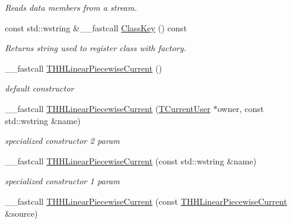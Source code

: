 \begin{DoxyCompactItemize}
\begin{DoxyCompactList}\small\item\em Reads data members from a stream. \end{DoxyCompactList}\item 
const std\+::wstring \&\+\_\+\+\_\+fastcall \hyperlink{class_t_h_h_linear_piecewise_current_a2f62f65488ad9489bdf671b6fd4dd837}{Class\+Key} () const 
\begin{DoxyCompactList}\small\item\em Returns string used to register class with factory. \end{DoxyCompactList}\item 
\hypertarget{class_t_h_h_linear_piecewise_current_a92e36381784a3cc1d602187edf73ec9b}{\+\_\+\+\_\+fastcall \hyperlink{class_t_h_h_linear_piecewise_current_a92e36381784a3cc1d602187edf73ec9b}{T\+H\+H\+Linear\+Piecewise\+Current} ()}\label{class_t_h_h_linear_piecewise_current_a92e36381784a3cc1d602187edf73ec9b}

\begin{DoxyCompactList}\small\item\em default constructor \end{DoxyCompactList}\item 
\hypertarget{class_t_h_h_linear_piecewise_current_a8d38ff0fb0a254ad6209bcd168dc4697}{\+\_\+\+\_\+fastcall \hyperlink{class_t_h_h_linear_piecewise_current_a8d38ff0fb0a254ad6209bcd168dc4697}{T\+H\+H\+Linear\+Piecewise\+Current} (\hyperlink{class_t_current_user}{T\+Current\+User} $\ast$owner, const std\+::wstring \&name)}\label{class_t_h_h_linear_piecewise_current_a8d38ff0fb0a254ad6209bcd168dc4697}

\begin{DoxyCompactList}\small\item\em specialized constructor 2 param \end{DoxyCompactList}\item 
\hypertarget{class_t_h_h_linear_piecewise_current_ac68b67b8c8cbaeadad49b8b70f4e8163}{\+\_\+\+\_\+fastcall \hyperlink{class_t_h_h_linear_piecewise_current_ac68b67b8c8cbaeadad49b8b70f4e8163}{T\+H\+H\+Linear\+Piecewise\+Current} (const std\+::wstring \&name)}\label{class_t_h_h_linear_piecewise_current_ac68b67b8c8cbaeadad49b8b70f4e8163}

\begin{DoxyCompactList}\small\item\em specialized constructor 1 param \end{DoxyCompactList}\item 
\hypertarget{class_t_h_h_linear_piecewise_current_a0f475541235ceab6e40af3aa6527e9e5}{\+\_\+\+\_\+fastcall \hyperlink{class_t_h_h_linear_piecewise_current_a0f475541235ceab6e40af3aa6527e9e5}{T\+H\+H\+Linear\+Piecewise\+Current} (const \hyperlink{class_t_h_h_linear_piecewise_current}{T\+H\+H\+Linear\+Piecewise\+Current} \&source)}\label{class_t_h_h_linear_piecewise_current_a0f475541235ceab6e40af3aa6527e9e5}


\end{DoxyCompactItemize}
